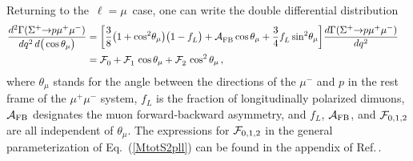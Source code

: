 \documentclass[amsmath,amssymb,aps,nofootinbib,prd,preprint,superscriptaddress,tightenlines,a4paper,bm]{revtex4-2}
\begin{document}
Returning to the \,$\ell=\mu$\, case, one can write the double differential distribution \cite{LHCb:2015tgy,He:2018yzu}
\begin{align}
    \frac{d^2\Gamma(\Sigma^+{\to} p\mu^+\mu^-)}{dq^2\, d\big(\cos\theta_\mu\big)} & =   \bigg[ \frac{3}{8} \big(1+{\rm cos}^2\theta_\mu\big) \big(1-f_L^{}\big) + {\cal A}_{\rm FB}^{} \cos\theta_\mu + \frac{3}{4} f_L^{}\, {\rm sin}^2\theta_\mu \bigg]
\frac{d\Gamma(\Sigma^+{\to} p\mu^+\mu^-)}{dq^2}
\nonumber \\ & = {\cal F}_0^{} + {\cal F}_1^{}\, \cos\theta_\mu + {\cal F}_2^{}\, \cos^2\theta_\mu \,, & \label{eq:doubledif}
\end{align}
where $\theta_\mu$ stands for the angle between the directions of the $\mu^-$ and $p$ in the rest frame of the $\mu^+\mu^-$ system, $f_L^{}$ is the fraction of longitudinally polarized dimuons, ${\cal A}_{\rm FB}$ designates the muon forward-backward asymmetry, and $f_L^{}$, ${\cal A}_{\rm FB}$, and ${\cal F}_{0,1,2}$ are all independent of $\theta_\mu$.
The expressions for ${\cal F}_{0,1,2}$ in the general parameterization of Eq.~(\ref{MtotS2pll}) can be found in the appendix of Ref.\,\cite{He:2018yzu}.
\end{document}

